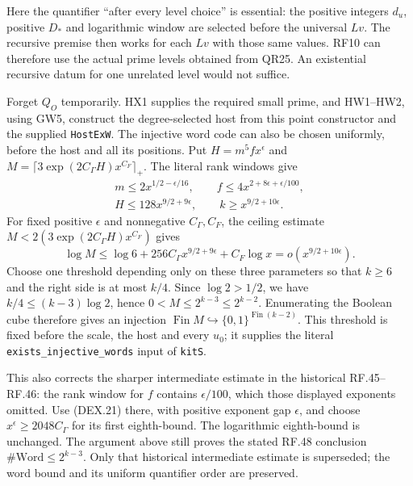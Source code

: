 \documentclass[11pt,a4paper]{article}
\numberwithin{equation}{section}
\theoremstyle{remark}\newtheorem{remark}[theorem]{Remark}
\begin{document}
Here the quantifier ``after every level choice'' is essential:
the positive integers $d_u$, positive $D_*$ and logarithmic window
are selected before the universal $Lv$. The recursive premise
then works for each $Lv$ with those same values. RF10 can therefore
use the actual prime levels obtained from QR25. An existential
recursive datum for one unrelated level would not suffice.

Forget $Q_O$ temporarily. HX1 supplies the required small prime,
and HW1--HW2, using GW5, construct the degree-selected host from
this point constructor and the supplied \texttt{HostExW}.
The injective word code can also be chosen uniformly, before the
host and all its positions. Put $H=m^5f x^\epsilon$ and
$M=\lceil3\exp(2C_\Gamma H)x^{C_F}\rceil_+$. The literal rank
windows give
\[
 \begin{gathered}
 m\le2x^{1/2-\epsilon/16},\qquad
 f\le4x^{2+8\epsilon+\epsilon/100},\\
 H\le128x^{9/2+9\epsilon},\qquad
 k\ge x^{9/2+10\epsilon}.
 \end{gathered}
                                                               \tag{DEX.21}
\]
For fixed positive $\epsilon$ and nonnegative $C_\Gamma,C_F$,
the ceiling estimate $M<2(3\exp(2C_\Gamma H)x^{C_F})$ gives
\[
 \log M\le\log6+256C_\Gamma x^{9/2+9\epsilon}
                         +C_F\log x=o(x^{9/2+10\epsilon}).
                                                               \tag{DEX.22}
\]
Choose one threshold depending only on these three parameters so
that $k\ge6$ and the right side is at most $k/4$. Since
$\log2>1/2$, we have $k/4\le(k-3)\log2$, hence
$0<M\le2^{k-3}\le2^{k-2}$. Enumerating the Boolean cube therefore
gives an injection $\operatorname{Fin}M\hookrightarrow
\{0,1\}^{\operatorname{Fin}(k-2)}$. This threshold is fixed before
the scale, the host and every $u_0$; it supplies the literal
\texttt{exists\_injective\_words} input of \texttt{kitS}.

This also corrects the sharper intermediate estimate in the historical
RF.45--RF.46: the rank window for $f$ contains $\epsilon/100$,
which those displayed exponents omitted. Use (DEX.21) there, with
positive exponent gap $\epsilon$, and choose
$x^\epsilon\ge2048C_\Gamma$ for its first eighth-bound.
The logarithmic eighth-bound is unchanged. The argument above still
proves the stated RF.48 conclusion $\#\mathrm{Word}\le2^{k-3}$.
Only that historical intermediate estimate is superseded; the
word bound and its uniform quantifier order are preserved.
\end{document}
